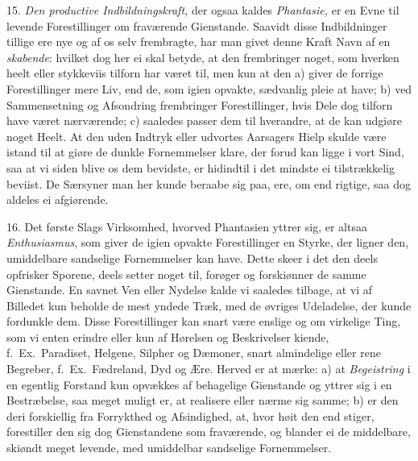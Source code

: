 \documentclass[12pt,a4paper]{article}
\newcommand{\opage}[1]{\marginnote{\footnotesize\textit{[#1]}}}
\begin{document}
15. \emph{Den productive Indbildningskraft,} der ogsaa kaldes \emph{Phantasie,} er en
Evne til levende Forestillinger om fraværende Gienstande. Saavidt disse Indbildninger
tillige ere nye og af os selv frembragte, har man givet denne Kraft Navn af en
\emph{skabende}: hvilket dog her ei skal betyde, at den frembringer noget, som hverken
heelt eller stykkeviis tilforn har været til, men kun at den a) giver de forrige
Forestillinger mere Liv, end de, som igien opvakte, sædvanlig pleie at have; b) ved
Sammensetning og Afsondring frembringer Forestillinger, hvis Dele dog tilforn have været
nærværende; c) saaledes passer dem til hverandre, at de kan udgiøre noget Heelt. At den
uden Indtryk eller udvortes Aarsagers Hielp skulde være istand til at giøre de dunkle
Fornemmelser klare, der forud kan ligge i vort Sind, saa at vi siden blive os dem
bevidste, er hidindtil i det mindste ei tilstrækkelig beviist. De Særsyner man her kunde
beraabe sig paa, ere, om end rigtige, saa dog aldeles ei afgiørende.

\opage{122} 16. Det første Slags Virksomhed, hvorved Phantasien yttrer sig, er altsaa
\emph{Enthusiasmus}, som giver de igien opvakte Forestillinger en Styrke, der ligner den,
umiddelbare sandselige Fornemmelser kan have. Dette skeer i det den deels opfrisker
Sporene, deels setter noget til, forøger og forskiønner de samme Gienstande. En savnet
Ven eller Nydelse kalde vi saaledes tilbage, at vi af Billedet kun beholde de mest yndede
Træk, med de øvriges Udeladelse, der kunde fordunkle dem. Disse Forestillinger kan snart
være enslige og om virkelige Ting, som vi enten erindre eller kun af Hørelsen og
Beskrivelser kiende, f.~Ex.\ Paradiset, Helgene, Silpher og Dæmoner, snart almindelige
eller rene Begreber, f.~Ex.\ Fædreland, Dyd og Ære. Herved er at mærke: a) at
\emph{Begeistring} i en egentlig Forstand kun opvækkes af behagelige Gienstande og yttrer
sig i en Bestræbelse, saa meget muligt er, at realisere eller nærme sig samme; b) er den
deri forskiellig fra Forrykthed og Afsindighed, at, hvor høit den end stiger, forestiller
den sig dog Gienstandene som fraværende, og blander ei de middelbare, skiøndt meget
levende, med umiddelbar sandselige Fornemmelser.
\end{document}
